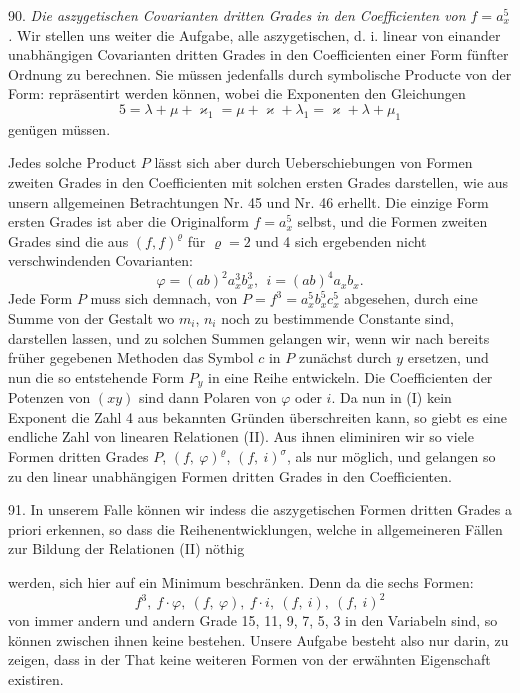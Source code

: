 90. \textit{Die aszygetischen Covarianten dritten Grades in den Coefficienten von $f=a_x^5$.} Wir stellen uns weiter die Aufgabe, alle aszygetischen, d. i. linear von einander unabhängigen Covarianten dritten Grades in den Coefficienten einer Form fünfter Ordnung zu berechnen. Sie müssen jedenfalls durch symbolische Producte von der Form:
repräsentirt werden können, wobei die Exponenten den Gleichungen
\[
5 = \lambda + \mu + \varkappa_1 = \mu + \varkappa + \lambda_1 = \varkappa + \lambda + \mu_1
\]
genügen müssen.

Jedes solche Product $P$ lässt sich aber durch Ueberschiebungen von Formen zweiten Grades in den Coefficienten mit solchen ersten Grades darstellen, wie aus unsern allgemeinen Betrachtungen Nr. 45 und Nr. 46 erhellt. Die einzige Form ersten Grades ist aber die Originalform $f=a_x^5$ selbst, und die Formen zweiten Grades sind die aus $(f, f)^\varrho$ für $\varrho = 2$ und 4 sich ergebenden nicht verschwindenden Covarianten:
\[
\varphi = (ab)^2 a_x^3 b_x^3,\ \ i = (ab)^4 a_x b_x.
\]
Jede Form $P$ muss sich demnach, von $P = f^3 = a_x^5 b_x^5 c_x^5$ abgesehen, durch eine Summe von der Gestalt
wo $m_i$, $n_i$ noch zu bestimmende Constante sind, darstellen lassen, und zu solchen Summen gelangen wir, wenn wir nach bereits früher gegebenen Methoden das Symbol $c$ in $P$ zunächst durch $y$ ersetzen, und nun die so entstehende Form $P_y$ in eine Reihe entwickeln. Die Coefficienten der Potenzen von $(xy)$ sind dann Polaren von $\varphi$ oder $i$. Da nun in (I) kein Exponent die Zahl 4 aus bekannten Gründen überschreiten kann, so giebt es eine endliche Zahl von linearen Relationen (II). Aus ihnen eliminiren wir so viele Formen dritten Grades $P$, $(f,\ \varphi)^\varrho$, $(f,\ i)^\sigma$, als nur möglich, und gelangen so zu den linear unabhängigen Formen dritten Grades in den Coefficienten.

91. In unserem Falle können wir indess die aszygetischen Formen dritten Grades a priori erkennen, so dass die Reihenentwicklungen, welche in allgemeineren Fällen zur Bildung der Relationen (II) nöthig


werden, sich hier auf ein Minimum beschränken. Denn da die sechs Formen:
\[
f^3,\ f\cdot\varphi,\ (f,\ \varphi),\ f\cdot i,\ (f,\ i),\ (f,\ i)^2
\]
von immer andern und andern Grade 15, 11, 9, 7, 5, 3 in den Variabeln sind, so können zwischen ihnen keine  bestehen. Unsere Aufgabe besteht also nur darin, zu zeigen, dass in der That keine weiteren Formen von der erwähnten Eigenschaft existiren.

